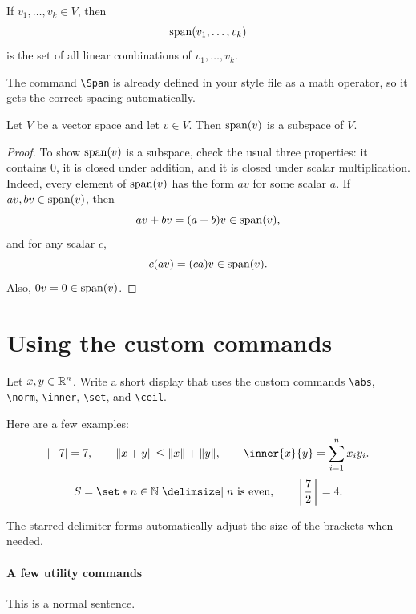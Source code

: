 \documentclass[11pt]{article}
\begin{document}
\begin{definition}[Span]
    If $v_1,\dots,v_k \in V$, then
    \[
        \operatorname{span}(v_1,\dots,v_k)
    \]
    is the set of all linear combinations of $v_1,\dots,v_k$.
\end{definition}

\begin{remark}
    The command \verb|\Span| is already defined in your style file as a math operator,
    so it gets the correct spacing automatically.
\end{remark}

\begin{theorem}
    Let $V$ be a vector space and let $v \in V$. Then $\operatorname{span}(v)$ is a subspace of $V$.
\end{theorem}

\begin{proof}
    To show $\operatorname{span}(v)$ is a subspace, check the usual three properties:
    it contains $0$, it is closed under addition, and it is closed under scalar multiplication.
    Indeed, every element of $\operatorname{span}(v)$ has the form $av$ for some scalar $a$.
    If $av,bv \in \operatorname{span}(v)$, then
    \[
        av+bv=(a+b)v \in \operatorname{span}(v),
    \]
    and for any scalar $c$,
    \[
        c(av)=(ca)v \in \operatorname{span}(v).
    \]
    Also, $0v=0 \in \operatorname{span}(v)$.
\end{proof}

\section{Using the custom commands}

\begin{problem}
    Let $x,y \in \mathbb{R}^n$. Write a short display that uses the custom commands
    \verb|\abs|, \verb|\norm|, \verb|\inner|, \verb|\set|, and \verb|\ceil|.
\end{problem}

\begin{solution}
    Here are a few examples:
    \[
        \abs{-7} = 7,
        \qquad
        \norm{x+y} \le \norm{x} + \norm{y},
        \qquad
        \inner{x}{y} = \sum_{i=1}^n x_i y_i.
    \]
    \[
        S = \set*{n \in \N \given n \text{ is even}},
        \qquad
        \ceil*{\frac{7}{2}} = 4.
    \]

    The starred delimiter forms automatically adjust the size of the brackets when needed.
\end{solution}

\paragraph{A few utility commands}

This is a normal sentence. 


\end{document}
